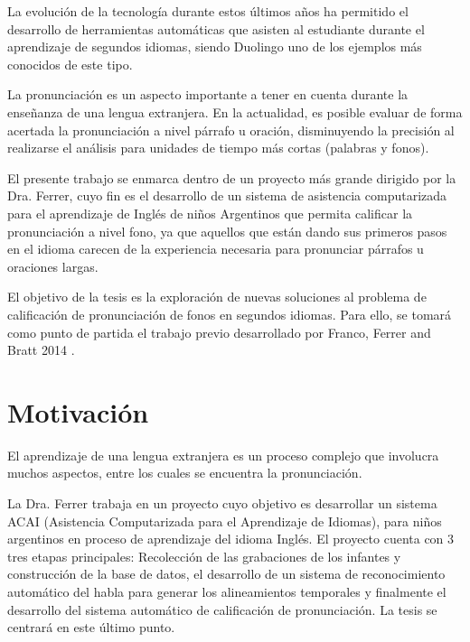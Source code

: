\documentclass[a4paper,12pt]{article} %
\begin{document}
La evolución de la tecnología durante estos últimos años ha permitido el desarrollo
de herramientas automáticas que asisten al estudiante durante el aprendizaje de 
segundos idiomas, siendo Duolingo uno de los ejemplos más conocidos de este tipo.

La pronunciación es un aspecto importante a tener en cuenta durante la enseñanza
de una lengua extranjera. En la
actualidad, es posible evaluar de forma acertada la pronunciación 
a nivel párrafo u oración, disminuyendo la precisión al 
realizarse el análisis para unidades de tiempo más cortas (palabras y fonos). 

El presente trabajo se enmarca dentro de un proyecto más grande dirigido por la Dra. Ferrer,
cuyo fin es el desarrollo de un sistema de asistencia computarizada para el 
aprendizaje de Inglés de niños Argentinos que permita calificar la pronunciación
a nivel fono, ya que aquellos que están dando sus primeros pasos en el idioma carecen
de la experiencia necesaria para pronunciar párrafos u oraciones largas. 

El objetivo de la tesis es la exploración de nuevas soluciones al problema de calificación
de pronunciación de fonos en segundos idiomas. Para ello, se tomará como punto de partida
el trabajo previo desarrollado por Franco, Ferrer and Bratt 2014 \cite{franco_ferrer_main_paper}.


\section{Motivación}

El aprendizaje de una lengua extranjera es un proceso complejo que involucra muchos 
aspectos, entre los cuales se encuentra la pronunciación.

La Dra. Ferrer trabaja en un proyecto cuyo objetivo es desarrollar un sistema ACAI 
(Asistencia Computarizada para el Aprendizaje de Idiomas), para niños argentinos 
en proceso de aprendizaje del idioma Inglés. El proyecto cuenta con 3 tres
etapas principales: Recolección de las grabaciones de los infantes y construcción de
la base de datos, el desarrollo de un sistema de reconocimiento automático del habla
para generar los alineamientos temporales y finalmente el desarrollo del sistema
automático de calificación de pronunciación. La tesis se centrará en este último punto.
\end{document}
